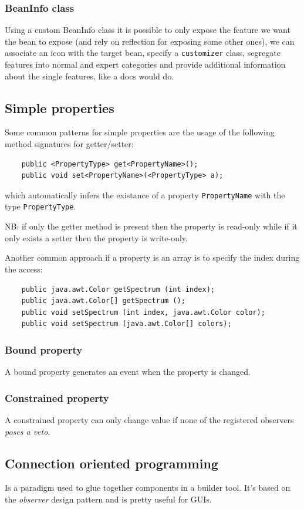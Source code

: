 \subsubsection{BeanInfo class}
Using a custom BeanInfo class it is possible to only expose the feature we want the bean to expose (and rely on reflection for exposing some other ones), we can associate an icon with the target bean, specify a \verb|customizer| class, segregate features into normal and expert categories and provide additional information about the single features, like a docs would do.

\subsection{Simple properties}
Some common patterns for simple properties are the usage of the following method signatures for getter/setter:
\begin{verbatim}
    public <PropertyType> get<PropertyName>();
    public void set<PropertyName>(<PropertyType> a);
\end{verbatim}
which automatically infers the existance of a property \verb|PropertyName| with the type \verb|PropertyType|.

NB: if only the getter method is present then the property is read-only while if it only exists a setter then the property is write-only.

Another common approach if a property is an array is to specify the index during the access:
\begin{verbatim}
    public java.awt.Color getSpectrum (int index);
    public java.awt.Color[] getSpectrum ();
    public void setSpectrum (int index, java.awt.Color color);
    public void setSpectrum (java.awt.Color[] colors);
\end{verbatim}

\subsubsection{Bound property}
A bound property generates an event when the property is changed.

\subsubsection{Constrained property}
A constrained property can only change value if none of the registered observers \emph{poses a veto}.

\subsection{Connection oriented programming}
Is a paradigm used to glue together components in a builder tool.
It's based on the \emph{observer} design pattern and is pretty useful for GUIs.

